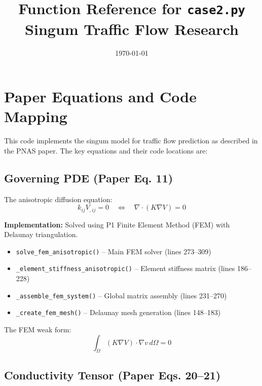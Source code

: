 \documentclass[11pt]{article}
\title{Function Reference for \texttt{case2.py}\\
\large Singum Traffic Flow Research}
\author{}
\date{\today}
\begin{document}
\maketitle

\tableofcontents
\newpage

\section{Paper Equations and Code Mapping}

This code implements the singum model for traffic flow prediction as described in the PNAS paper. The key equations and their code locations are:

\subsection{Governing PDE (Paper Eq. 11)}

The anisotropic diffusion equation:
\begin{equation}
    k_{ij} V_{,ij} = 0 \quad \Leftrightarrow \quad \nabla \cdot (K \nabla V) = 0
\end{equation}

\textbf{Implementation:} Solved using P1 Finite Element Method (FEM) with Delaunay triangulation.
\begin{itemize}[noitemsep]
    \item \texttt{solve\_fem\_anisotropic()} -- Main FEM solver (lines 273--309)
    \item \texttt{\_element\_stiffness\_anisotropic()} -- Element stiffness matrix (lines 186--228)
    \item \texttt{\_assemble\_fem\_system()} -- Global matrix assembly (lines 231--270)
    \item \texttt{\_create\_fem\_mesh()} -- Delaunay mesh generation (lines 148--183)
\end{itemize}

The FEM weak form:
\begin{equation}
    \int_\Omega (K \nabla V) \cdot \nabla v \, d\Omega = 0
\end{equation}

\subsection{Conductivity Tensor (Paper Eqs. 20--21)}
\end{document}
